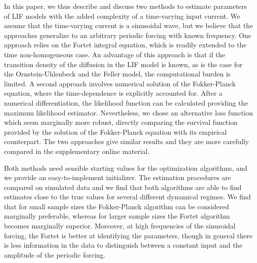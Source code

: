 In this paper, we thus describe and discuss two methods to estimate parameters
of LIF models with the added complexity of a time-varying input current. We
assume that the time-varying current is a sinusoidal wave, but we believe that
the approaches generalize to an arbitrary periodic forcing with known frequency.
One approach relies on the Fortet integral equation, which is readily extended
to the time non-homogeneous case. An advantage of this approach is that if the
transition density of the diffusion in the LIF model is known, as is the case
for the Ornstein-Uhlenbeck and the Feller model, the computational burden is
limited. A second approach involves numerical solution of the Fokker-Planck
equation, where the time-dependence is explicitly accounted for. After a
numerical differentiation, the likelihood function can be calculated providing
the maximum likelihood estimator. Nevertheless, we chose an alternative loss
function which seem marginally more robust, directly comparing the survival
function provided by the solution of the Fokker-Planck equation with its
empirical counterpart. The two approaches give similar results and they are more
carefully compared in the supplementary online material.

Both methods need sensible starting values for the optimization
algorithms, and we provide an easy-to-implement initializer. The estimation
procedures are compared on simulated data and we find that both algorithms are
able to find estimates close to the true values for several different dynamical
regimes. We find that for small sample sizes the Fokker-Planck algorithm can be
considered marginally preferable, whereas for larger sample sizes the Fortet
algorithm becomes marginally superior. Moreover, at high frequencies of the
sinusoidal forcing, the Fortet is better at identifying the parameters, though in general
there is less information in the data to distinguish between a constant input
and the amplitude of the periodic forcing.

